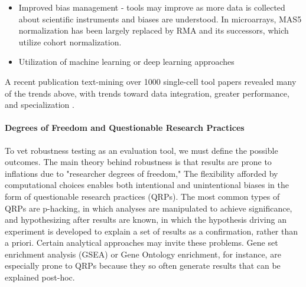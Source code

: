 \documentclass{drexelthesis}
\begin{document}
\begin{itemize}
	\item Improved bias management - tools may improve as more data is collected about scientific instruments and biases are understood. In microarrays, MAS5 normalization has been largely replaced by RMA \cite{Lim2007-jb} and its successors, which utilize cohort normalization.

	\item Utilization of machine learning or deep learning approaches

\end{itemize}
A recent publication text-mining over 1000 single-cell tool papers revealed many of the trends above, with trends toward data integration, greater performance, and specialization \cite{Zappia2021-op}.

\paragraph{Degrees of Freedom and Questionable Research Practices}

To vet robustness testing as an evaluation tool, we must define the possible outcomes. The main theory behind robustness is that results are prone to inflations due to "researcher degrees of freedom," \cite{Bakker2020-qr} The flexibility afforded by computational choices enables both intentional and unintentional biases in the form of questionable research practices (QRPs). The most common types of QRPs are p-hacking, in which analyses are manipulated to achieve significance, and hypothesizing after results are known, in which the hypothesis driving an experiment is developed to explain a set of results as a confirmation, rather than a priori. Certain analytical approaches may invite these problems. Gene set enrichment analysis (GSEA) or Gene Ontology enrichment, for instance, are especially prone to QRPs \cite{John2012-lb} \cite{Timmons2015-yg,Wijesooriya2021-jc} because they so often generate results that can be explained post-hoc.
\end{document}
